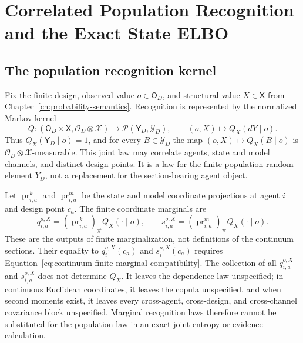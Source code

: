 \chapter{Correlated Population Recognition and the Exact State ELBO}
\label{ch:structured-recognition-elbo}

\section{The population recognition kernel}

Fix the finite design, observed value \(o\in\mathsf O_D\), and structural value \(X\in\mathsf X\) from Chapter~\ref{ch:probability-semantics}. Recognition is represented by the normalized Markov kernel
\begin{equation}
Q:(\mathsf O_D\times\mathsf X,
\mathscr O_D\otimes\mathscr X)
\longrightarrow\mathcal P(\mathsf Y_D,\mathscr Y_D),
\qquad
(o,X)\longmapsto Q_X(dY\mid o).
\label{eq:structured-recognition-kernel}
\end{equation}
Thus \(Q_X(\mathsf Y_D\mid o)=1\), and for every \(B\in\mathscr Y_D\) the map \((o,X)\mapsto Q_X(B\mid o)\) is \(\mathscr O_D\otimes\mathscr X\)-measurable. This joint law may correlate agents, state and model channels, and distinct design points. It is a law for the finite population random element \(Y_D\), not a replacement for the section-bearing agent object.

Let \(\operatorname{pr}_{i,a}^{k}\) and \(\operatorname{pr}_{i,a}^{m}\) be the state and model coordinate projections at agent \(i\) and design point \(c_a\). The finite coordinate marginals are
\begin{equation}
q_{i,a}^{o,X}
=\left(\operatorname{pr}_{i,a}^{k}\right)_{\#}
Q_X(\mathord\cdot\mid o),
\qquad
s_{i,a}^{o,X}
=\left(\operatorname{pr}_{i,a}^{m}\right)_{\#}
Q_X(\mathord\cdot\mid o).
\label{eq:structured-recognition-pushforwards}
\end{equation}
These are the outputs of finite marginalization, not definitions of the continuum sections. Their equality to \(q_i^{o,X}(c_a)\) and \(s_i^{o,X}(c_a)\) requires Equation~\eqref{eq:continuum-finite-marginal-compatibility}. The collection of all \(q_{i,a}^{o,X}\) and \(s_{i,a}^{o,X}\) does not determine \(Q_X\). It leaves the dependence law unspecified; in continuous Euclidean coordinates, it leaves the copula unspecified, and when second moments exist, it leaves every cross-agent, cross-design, and cross-channel covariance block unspecified. Marginal recognition laws therefore cannot be substituted for the population law in an exact joint entropy or evidence calculation.


